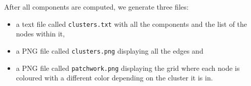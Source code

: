 After all components are computed, we generate three files:
\begin{itemize}
\item a text file called \verb!clusters.txt! with all the components and
the list of the nodes within it,
\item a PNG file called \verb!clusters.png! displaying all the edges and
\item a PNG file called \verb!patchwork.png! displaying the grid where
each node is coloured with a different color depending on the cluster it
is in.
\end{itemize}



